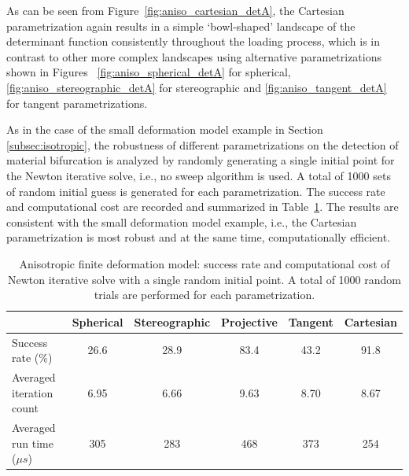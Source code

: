 \documentclass[12pt]{article}
\numberwithin{equation}{section}
\begin{document}
As can be seen from Figure~\ref{fig:aniso_cartesian_detA}, the 
Cartesian parametrization again results in a simple `bowl-shaped' 
landscape of the determinant function consistently throughout the 
loading process, which is in contrast to other more complex landscapes 
using alternative parametrizations shown in Figures~ 
\ref{fig:aniso_spherical_detA} for spherical, 
\ref{fig:aniso_stereographic_detA} for stereographic and 
\ref{fig:aniso_tangent_detA} for tangent parametrizations. 

As in the case of the small deformation model example in 
Section \ref{subsec:isotropic}, the robustness of different 
parametrizations on the detection of material bifurcation is analyzed 
by randomly generating a single initial point for the Newton iterative 
solve, i.e., no sweep algorithm is used. A total of 1000 sets of 
random initial guess is generated for each parametrization. The 
success rate and computational cost are recorded and summarized in 
Table~\ref{tab:aniso_axial_random_para}. The results are consistent 
with the small deformation model example, i.e., the Cartesian 
parametrization is most robust and at the same time, computationally efficient. 

\begin{table}[H]
  \begin{center}
    \begin{tabular}{l | c c c c c}
      \toprule
        &  Spherical    &   Stereographic   & Projective   &   Tangent   &   Cartesian                 \\
      \midrule
      Success rate ($\%$)                      &    26.6    &    28.9    &    83.4     &    43.2     &   91.8          \\ 
      Averaged iteration count                         &    6.95    &    6.66    &    9.63     &    8.70     &   8.67          \\
      Averaged run time (${\mu}s$)     &    305     &    283     &    468      &    373      &     254         \\
      \bottomrule
    \end{tabular}
    \caption{Anisotropic finite deformation model: success rate and computational cost of Newton iterative solve with a single random initial point. A total of 1000 random trials are performed for each parametrization.}
    \label{tab:aniso_axial_random_para}
  \end{center}
\end{table}
\end{document}
